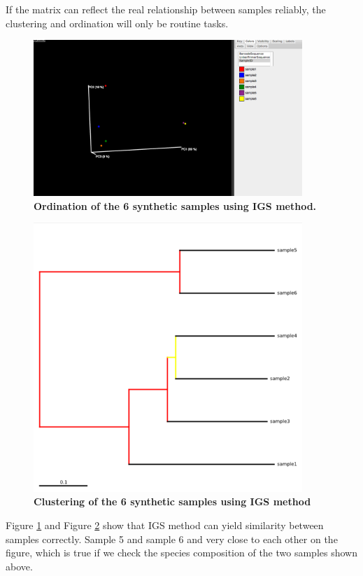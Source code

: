 If the matrix can reflect the real 
relationship between samples reliably, the clustering and ordination
will only be routine tasks.


\begin{figure}[!ht]
 \centerline{\includegraphics[width=4in]{./figures/simple_PCA_3d.png}}
\caption{\bf Ordination of the 6 synthetic samples using IGS method.}
\label{fig:simple_pcoa}
\end{figure}


\begin{figure}[!ht]
 \centerline{\includegraphics[width=4in]{./figures/simple_tree.png}}
\caption{\bf Clustering of the 6 synthetic samples using IGS method}
\label{fig:simple_cluster}
\end{figure}



Figure \ref{fig:simple_pcoa} and Figure \ref{fig:simple_cluster} show that 
IGS method can yield similarity between samples correctly. Sample 5 and sample 6 and very 
close to each other on the figure, which 
is true if we check the species composition of the two samples shown above.


